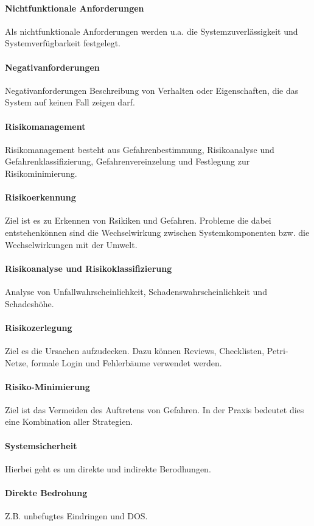 \paragraph{Nichtfunktionale Anforderungen}
Als nichtfunktionale Anforderungen werden u.a. die Systemzuverlässigkeit und Systemverfügbarkeit festgelegt.
\paragraph{Negativanforderungen}
Negativanforderungen Beschreibung von Verhalten oder Eigenschaften, die das System auf keinen Fall zeigen darf.
\paragraph{Risikomanagement}
Risikomanagement besteht aus Gefahrenbestimmung, Risikoanalyse und Gefahrenklassifizierung, Gefahrenvereinzelung und Festlegung zur Risikominimierung.
\paragraph{Risikoerkennung}
Ziel ist es zu Erkennen von Rsikiken und Gefahren. Probleme die dabei entstehenkönnen sind die Wechselwirkung zwischen Systemkomponenten bzw. die Wechselwirkungen mit der Umwelt.
\paragraph{Risikoanalyse und Risikoklassifizierung}
Analyse von Unfallwahrscheinlichkeit, Schadenswahrscheinlichkeit und Schadeshöhe.
\paragraph{Risikozerlegung}
Ziel es die Ursachen aufzudecken. Dazu können Reviews, Checklisten, Petri-Netze, formale Login und Fehlerbäume verwendet werden.
\paragraph{Risiko-Minimierung}
Ziel ist das Vermeiden des Auftretens von Gefahren. In der Praxis bedeutet dies eine Kombination aller Strategien.
\paragraph{Systemsicherheit}
Hierbei geht es um direkte und indirekte Berodhungen.
\paragraph{Direkte Bedrohung}
Z.B. unbefugtes Eindringen und DOS.
